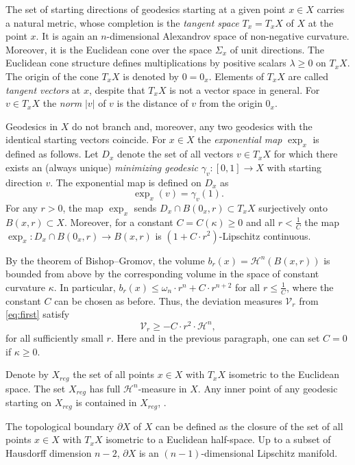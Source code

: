 \documentclass[12pt,leqno,intlimits]{amsart}
\numberwithin{equation}{section}
\theoremstyle{definition}
\theoremstyle{remark}
\def\:{\colon}
\begin{document}
The set of starting directions of geodesics starting at a given point $x\in X$ carries a natural metric, whose completion is the \emph{tangent space} $T_x=T_xX$
of $X$ at the point $x$. It is again an $n$-dimensional Alexandrov space of non-negative curvature. Moreover, it is the Euclidean cone
over the space $\Sigma _x$ of unit directions. The Euclidean cone structure defines multiplications by positive scalars $\lambda \geq 0$ on $T_xX$. The origin
of the cone $T_xX$ is denoted by $0=0_x$.
Elements of $T_xX$ are called \emph{tangent vectors} at $x$, despite that $T_xX$ is not a vector space in general.
For $v\in T_xX$ the \emph{norm} $|v|$ of $v$ is the distance of $v$ from the origin $0_x$.

Geodesics in $X$ do not branch
and, moreover, any two geodesics with the identical starting vectors coincide.
For $x\in X$ the \emph{exponential map} $\exp_x$ is defined as follows.
Let $D_x$ denote the set of all vectors $v\in T_xX$ for which there exists an (always unique) \emph{minimizing geodesic} $\gamma_v\:[0,1] \to X$ with starting direction $v$. The exponential map is defined on $D_x$ as
$$\exp _x (v)= \gamma _v(1).$$
For any $r>0$, the map $\exp_x$ sends $D_x\cap B (0_x,r)\subset T_xX$ surjectively onto $B(x,r)\subset X$.
Moreover, for a constant $C=C(\kappa)\geq 0$ and all $r< \frac 1 C$ the map $\exp_x \:D_x \cap B(0_x,r) \to B(x,r)$ is $(1+ C \cdot r^2)$-Lipschitz continuous.

By the theorem of Bishop--Gromov, the volume $b_r (x)=\mathcal H^n (B(x,r))$ is bounded from above by the corresponding volume in the
space of constant curvature $\kappa$. In particular, $b_r (x) \leq \omega _n \cdot r^n + C \cdot r^{n+2}$ for all $r\leq \frac 1 C$, where
the constant $C$ can be chosen as before. Thus, the deviation measures $\mathcal{V}_r $ from \eqref{eq:first} satisfy
$$\mathcal{V}_r \geq -C\cdot r^2\cdot  \mathcal H^n,$$
for all sufficiently small $r$.
Here and in the previous paragraph, one can set $C=0$ if $\kappa \geq 0$.

Denote by $X_{reg}$ the set of all points $x\in X$ with $T_xX$ isometric to the Euclidean space.
The set $X_{reg}$ has full $\mathcal H^n$-measure in $X$.
Any inner point of any geodesic starting on $X_{reg}$ is contained in $X_{reg}$, \cite{Petparallel}.

The topological boundary $\partial X$ of $X$ can be defined as the closure of the set of all points $x\in X$ with $T_xX$ isometric to a Euclidean half-space. Up to a subset of Hausdorff dimension $n-2$, $\partial X$ is an $(n-1)$-dimensional Lipschitz manifold.
\end{document}
